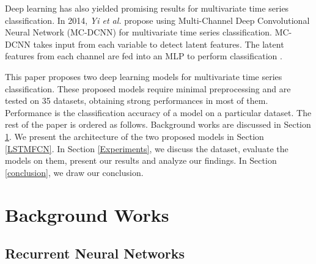 \documentclass[preprint,12pt,3p]{elsarticle}
\begin{document}
Deep learning has also yielded promising results for multivariate time series classification. In 2014, \textit{Yi et al.} propose using Multi-Channel Deep Convolutional Neural Network (MC-DCNN) for multivariate time series classification. MC-DCNN takes input from each variable to detect latent features. The latent features from each channel are fed into an MLP to perform classification \cite{zheng2014time}. 

This paper proposes two deep learning models for multivariate time series classification. These proposed models require minimal preprocessing and are tested on 35 datasets, obtaining strong performances in most of them. Performance is the classification accuracy of a model on a particular dataset. The rest of the paper is ordered as follows. Background works are discussed in Section \ref{Background Works}. We present the architecture of the two proposed models in Section \ref{LSTMFCN}. In Section \ref{Experiments}, we discuss the dataset, evaluate the models on them, present our results and analyze our findings. In Section \ref{conclusion}, we draw our conclusion. 





 















\section{Background Works}
\label{Background Works}
\subsection{Recurrent Neural Networks}
\def\x{{\mathbf x}}
\def\L{{\cal L}}
\end{document}
